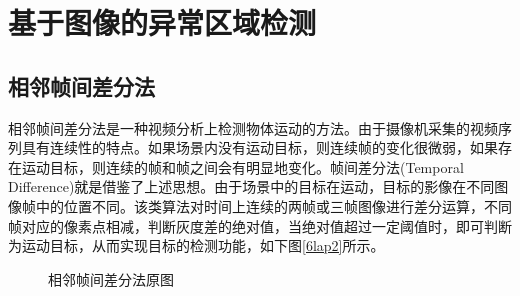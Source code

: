 \documentclass[a4paper,AutoFakeBold,oneside,12pt]{book}
\begin{document}
\section{基于图像的异常区域检测}
\subsection{相邻帧间差分法}
	相邻帧间差分法是一种视频分析上检测物体运动的方法。由于摄像机采集的视频序列具有连续性的特点。如果场景内没有运动目标，则连续帧的变化很微弱，如果存在运动目标，则连续的帧和帧之间会有明显地变化。帧间差分法(Temporal Difference)就是借鉴了上述思想。由于场景中的目标在运动，目标的影像在不同图像帧中的位置不同。该类算法对时间上连续的两帧或三帧图像进行差分运算，不同帧对应的像素点相减，判断灰度差的绝对值，当绝对值超过一定阈值时，即可判断为运动目标，从而实现目标的检测功能\cite{李波2008利用相邻帧和背景信息的运动对象检测}，如下图\ref{6lap2}所示。

\begin{figure}[!htbp]
    \centering
    \quad %
   \caption{相邻帧间差分法原图} %
    \label{Fig:6lap} %


\end{figure}

\end{document}
